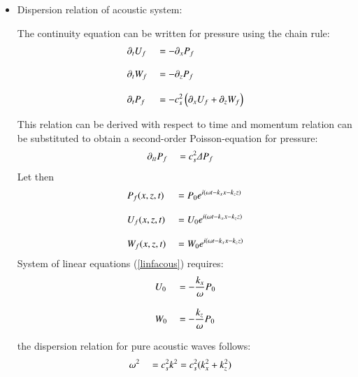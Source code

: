 \documentclass[a4paper,11pt]{article}
\begin{document}
\begin{itemize}[label=\textbullet,font=\tiny]
   \item {Dispersion relation of acoustic system}:
   
The continuity equation can be written for pressure using the chain rule:
  \begin{equation}
  \label{linfacous}
    \begin{split}
	\displaystyle
	&\partial_t U_f&&=-\partial_x P_f\\[3mm]
	&\partial_t W_f&&=-\partial_z P_f\\[3mm]
	&\partial_t P_f &&=-c_s^2 \left( \partial_x U_f+\partial_z W_f \right)
    \end{split}  
  \end{equation}
    
  This relation can be derived with respect to time and momentum relation can be substituted to obtain a second-order Poisson-equation for pressure:
  \begin{equation}
  \label{PoissonP}
    \begin{split}
	\displaystyle
	&\partial_{tt} P_f &&= c_s^2 \Delta P_f
    \end{split}  
  \end{equation}
  Let then
  \begin{equation}
    \begin{split}
      \displaystyle
      &P_f(x,z,t)&&=P_0 e^{i(\omega t-k_x x-k_z z)}\\[3mm]
      &U_f(x,z,t)&&=U_0 e^{i(\omega t-k_x x-k_z z)}\\[3mm]
      &W_f(x,z,t)&&=W_0 e^{i(\omega t-k_x x-k_z z)}
    \end{split}
  \end{equation}
  System of linear equations (\ref{linfacous}) requires:
  \begin{equation}
    \begin{split}
	\displaystyle
	&U_0 &&=-\frac{k_x}{\omega} P_0\\[3mm]
	&W_0 &&=-\frac{k_z}{\omega} P_0
    \end{split}  
  \end{equation}

  the dispersion relation for pure acoustic waves follows:
  \begin{equation}
    \label{dispacous}
    \begin{split}
      \displaystyle
      &\omega^2 &&=c_s^2 k^2=c_s^2(k_x^2+k_z^2)
    \end{split}
  \end{equation}

  \end{itemize}
  
\end{document}
